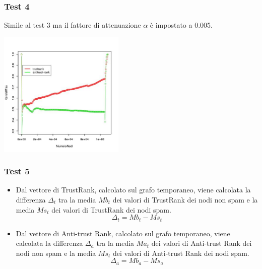\documentclass{beamer}
\begin{document}
\begin{frame}
\frametitle{Test 4}
Simile al test 3 ma il fattore di attenuazione \(\alpha\)  è impostato a 0.005.
   \begin{center}
 \includegraphics[height=6cm]{immagini/test4/coplotTrustAnti_Mode1_set3776_62_alpha0005}
\end{center}
\end{frame}
\begin{frame}
\frametitle{Test 5}
\begin{itemize}
 \item Dal vettore di TrustRank,  calcolato sul grafo temporaneo, viene calcolata la differenza \(\Delta_t\) tra la media \(Mb_t\) dei valori di TrustRank dei nodi non spam e la media \(Ms_t\) dei valori di TrustRank dei nodi spam.
 \begin{equation}
 \Delta_t = Mb_t-Ms_t
\end{equation}
  \item Dal vettore di Anti-trust Rank,  calcolato sul grafo temporaneo, viene calcolata la differenza \(\Delta_a\) tra la media \(Ma_t\) dei valori di Anti-trust Rank dei nodi non spam e la media \(Ms_t\) dei valori di Anti-trust Rank dei nodi spam.
  \begin{equation}
 \Delta_a=Mb_a-Ms_a
\end{equation}
\end{itemize}
\end{frame}
\end{document}
